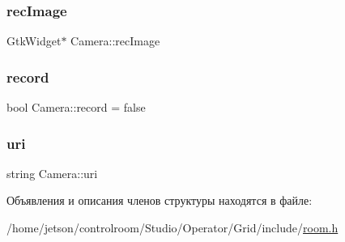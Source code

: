 \mbox{\label{struct_camera_af6f95a716318992fa911c03349ec44f6}} 
\subsubsection{\texorpdfstring{rec\+Image}{recImage}}
{\footnotesize\ttfamily Gtk\+Widget$\ast$ Camera\+::rec\+Image}

\mbox{\label{struct_camera_ab381a0e30d838132bea08b14686ea2f5}} 
\subsubsection{\texorpdfstring{record}{record}}
{\footnotesize\ttfamily bool Camera\+::record = false}

\mbox{\label{struct_camera_a5d50a2e299b2cccd65b57982c678c8c4}} 
\subsubsection{\texorpdfstring{uri}{uri}}
{\footnotesize\ttfamily string Camera\+::uri}



Объявления и описания членов структуры находятся в файле\+:\begin{DoxyCompactItemize}
\item 
/home/jetson/controlroom/\+Studio/\+Operator/\+Grid/include/\hyperlink{_operator_2_grid_2include_2room_8h}{room.\+h}\end{DoxyCompactItemize}
